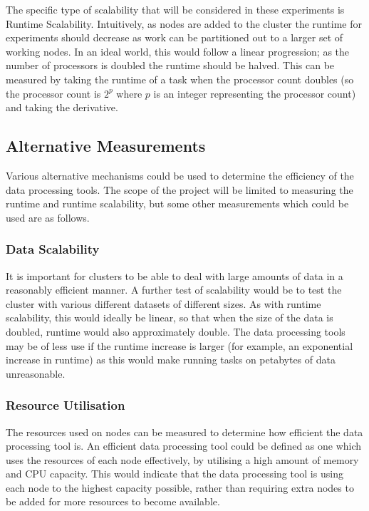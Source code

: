 The specific type of scalability that will be considered in these experiments is Runtime Scalability. Intuitively, as nodes are added to the cluster the runtime for experiments should decrease as work can be partitioned out to a larger set of working nodes. In an ideal world, this would follow a linear progression; as the number of processors is doubled the runtime should be halved. This can be measured by taking the runtime of a task when the processor count doubles (so the processor count is $2^{p}$ where $p$ is an integer representing the processor count) and taking the derivative. 

\subsection{Alternative Measurements}
Various alternative mechanisms could be used to determine the efficiency of the data processing tools. The scope of the project will be limited to measuring the runtime and runtime scalability, but some other measurements which could be used are as follows.

\subsubsection{Data Scalability}
It is important for clusters to be able to deal with large amounts of data in a reasonably efficient manner. A further test of scalability would be to test the cluster with various different datasets of different sizes. As with runtime scalability, this would ideally be linear, so that when the size of the data is doubled, runtime would also approximately double. The data processing tools may be of less use if the runtime increase is larger (for example, an exponential increase in runtime) as this would make running tasks on petabytes of data unreasonable.

\subsubsection{Resource Utilisation}
The resources used on nodes can be measured to determine how efficient the data processing tool is. An efficient data processing tool could be defined as one which uses the resources of each node effectively, by utilising a high amount of memory and CPU capacity. This would indicate that the data processing tool is using each node to the highest capacity possible, rather than requiring extra nodes to be added for more resources to become available.

